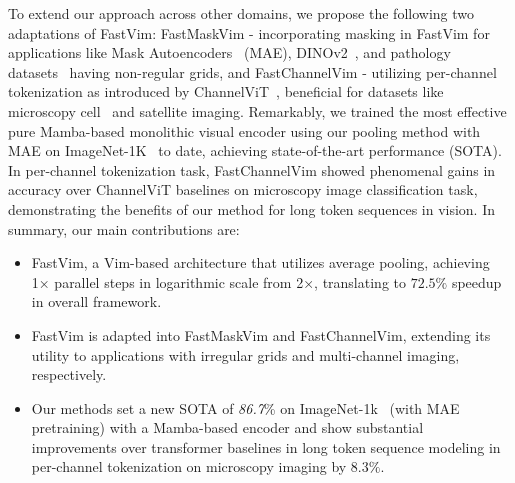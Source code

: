 To extend our approach across other domains, we propose the following two adaptations of FastVim: FastMaskVim - incorporating masking in FastVim for applications like Mask Autoencoders~\cite{mae} (MAE), DINOv2~\cite{dinov2}, and pathology datasets~\cite{chen2024towards} having non-regular grids, and FastChannelVim - utilizing per-channel tokenization as introduced by ChannelViT~\cite{channelvit}, beneficial for datasets like microscopy cell~\cite{chandrasekaran2023jump} and satellite imaging. Remarkably, we trained the most effective pure Mamba-based monolithic visual encoder using our pooling method with MAE on ImageNet-1K~\cite{imagenet} to date, achieving state-of-the-art performance (SOTA). In per-channel tokenization task, FastChannelVim showed phenomenal gains in accuracy over ChannelViT baselines on microscopy image classification task, demonstrating the benefits of our method for long token sequences in vision. In summary, our main contributions are:


\begin{itemize}
    \item FastVim, a Vim-based architecture that utilizes average pooling, achieving 1× parallel steps in logarithmic scale from 2×, translating to $72.5\%$ speedup in overall framework.

    \item FastVim is adapted into FastMaskVim and FastChannelVim, extending its utility to applications with irregular grids and multi-channel imaging, respectively.

    \item Our methods set a new SOTA of \textit{86.7}\% on ImageNet-1k~\cite{imagenet} (with MAE pretraining) with a Mamba-based encoder and show substantial improvements over transformer baselines in long token sequence modeling in per-channel tokenization on microscopy imaging by $8.3\%$.
    
\end{itemize}
